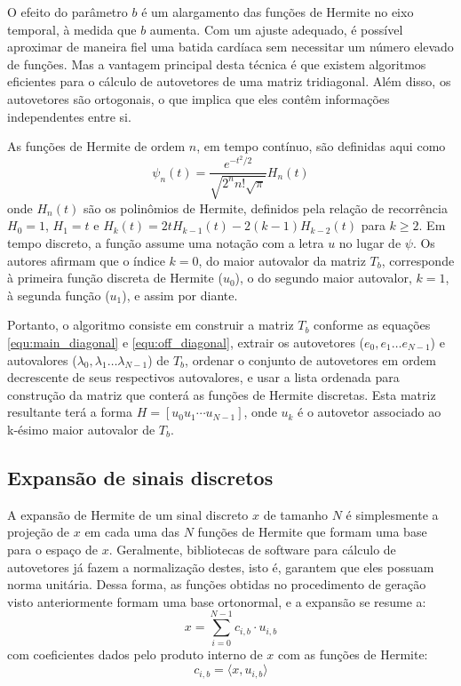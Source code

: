 O efeito do parâmetro $b$ é um alargamento das funções de Hermite no eixo temporal, à medida que $b$ aumenta. Com um ajuste adequado, é possível aproximar de maneira fiel uma batida cardíaca sem necessitar um número elevado de funções. Mas a vantagem principal desta técnica é que existem algoritmos eficientes para o cálculo de autovetores de uma matriz tridiagonal. Além disso, os autovetores são ortogonais, o que implica que eles contêm informações independentes entre si.

As funções de Hermite de ordem $n$, em tempo contínuo, são definidas aqui como
\begin{equation} \label{equ:hermite_func2}
    \psi_n(t) = \frac{e^{-t^2/2}}{\sqrt{2^nn!\sqrt{\pi}}}H_n(t)
\end{equation}
onde $H_n(t)$ são os polinômios de Hermite, definidos pela relação de recorrência $H_0 = 1$, $H_1 = t$ e $H_k(t)=2tH_{k-1}(t)-2(k-1)H_{k-2}(t)$ para $k \geq 2$. Em tempo discreto, a função assume uma notação com a letra $u$ no lugar de $\psi$. Os autores afirmam que o índice $k=0$, do maior autovalor da matriz $T_b$, corresponde à primeira função discreta de Hermite ($u_0$), o do segundo maior autovalor, $k=1$, à segunda função ($u_1$), e assim por diante. 

Portanto, o algoritmo consiste em construir a matriz $T_b$ conforme as equações \ref{equ:main_diagonal} e \ref{equ:off_diagonal}, extrair os autovetores ($e_0, e_1 \ldots e_{N-1}$) e autovalores ($\lambda_0, \lambda_1 \ldots \lambda_{N-1}$) de $T_b$, ordenar o conjunto de autovetores em ordem decrescente de seus respectivos autovalores, e usar a lista ordenada para construção da matriz que conterá as funções de Hermite discretas. Esta matriz resultante terá a forma $H = [u_0 u_1 \cdots u_{N-1}]$, onde $u_k$ é o autovetor associado ao k-ésimo maior autovalor de $T_b$. 

\subsection{Expansão de sinais discretos}
A expansão de Hermite de um sinal discreto $x$ de tamanho $N$ é simplesmente a projeção de $x$ em cada uma das $N$ funções de Hermite que formam uma base para o espaço de $x$. Geralmente, bibliotecas de software para cálculo de autovetores já fazem a normalização destes, isto é, garantem que eles possuam norma unitária. Dessa forma, as funções obtidas no procedimento de geração visto anteriormente formam uma base ortonormal, e a expansão se resume a:
\begin{equation} \label{equ:hermite_exp2}
    x = \sum_{i=0}^{N-1} c_{i,b}\cdot u_{i,b}
\end{equation}
com coeficientes dados pelo produto interno de $x$ com as funções de Hermite:
\begin{equation} \label{equ:hermite_coeff2}
    c_{i,b} = \langle x,u_{i,b} \rangle
\end{equation}


